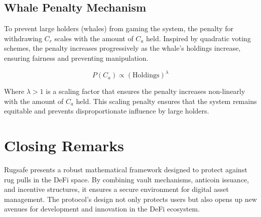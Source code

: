 \documentclass{article}
\begin{document}


\subsection{Whale Penalty Mechanism}
To prevent large holders (whales) from gaming the system, the penalty for withdrawing $C_r$ scales with the amount of $C_a$ held. Inspired by quadratic voting schemes, the penalty increases progressively as the whale's holdings increase, ensuring fairness and preventing manipulation.

\begin{equation}
P(C_a) \propto \left(\text{Holdings}\right)^\lambda
\end{equation}

Where $\lambda > 1$ is a scaling factor that ensures the penalty increases non-linearly with the amount of $C_a$ held. This scaling penalty ensures that the system remains equitable and prevents disproportionate influence by large holders.

\section{Closing Remarks}
Rugsafe presents a robust mathematical framework designed to protect against rug pulls in the DeFi space. By combining vault mechanisms, anticoin issuance, and incentive structures, it ensures a secure environment for digital asset management. The protocol's design not only protects users but also opens up new avenues for development and innovation in the DeFi ecosystem.
\end{document}
